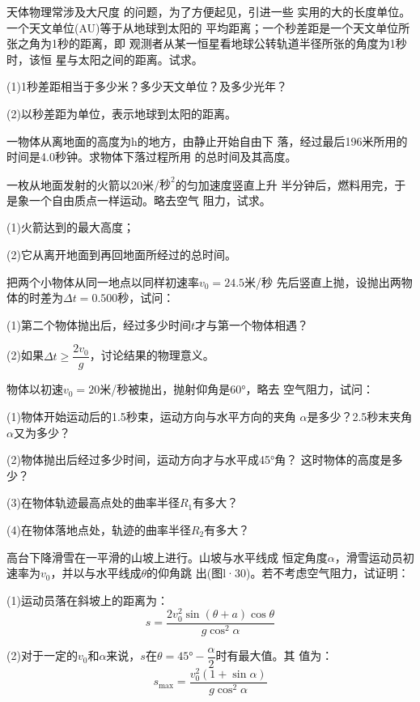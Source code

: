 \exercise 天体物理常涉及大尺度
的问题，为了方便起见，引进一些
实用的大的长度单位。一个天文单位(AU)等于从地球到太阳的
平均距离；一个秒差距是一个天文单位所张之角为1秒的距离，即
观测者从某一恒星看地球公转轨道半径所张的角度为1秒时，该恒
星与太阳之间的距离。试求。

(1)1秒差距相当于多少米？多少天文单位？及多少光年？

(2)以秒差距为单位，表示地球到太阳的距离。

\exercise 一物体从离地面的高度为h的地方，由静止开始自由下
落，经过最后196米所用的时间是4.0秒钟。求物体下落过程所用
的总时间及其高度。

\exercise 一枚从地面发射的火箭以20米/$\text{秒}^2$的匀加速度竖直上升
半分钟后，燃料用完，于是象一个自由质点一样运动。略去空气
阻力，试求。

(1)火箭达到的最大高度；

(2)它从离开地面到再回地面所经过的总时间。

\exercise 把两个小物体从同一地点以同样初速率$v_0=24.5$米/秒
先后竖直上抛，设抛出两物体的时差为$\Delta t=0.500$秒，试问：

(1)第二个物体抛出后，经过多少时间$t$才与第一个物体相遇？

(2)如果$\Delta t\geqslant\dfrac{2v_0}{g}$，讨论结果的物理意义。


\exercise 物体以初速$v_0=20$米/秒被抛出，抛射仰角是\ang{60;;}，略去
空气阻力，试问：

(1)物体开始运动后的1.5秒束，运动方向与水平方向的夹角
$\alpha$是多少？2.5秒末夹角$\alpha$又为多少？

(2)物体抛出后经过多少时间，运动方向才与水平成\ang{45;;}角？
这时物体的高度是多少？

(3)在物体轨迹最高点处的曲率半径$R_1$有多大？

(4)在物体落地点处，轨迹的曲率半径$R_2$有多大？

\exercise 高台下降滑雪在一平滑的山坡上进行。山坡与水平线成
恒定角度$\alpha$，滑雪运动员初速率为$v_0$，并以与水平线成$\theta$的仰角跳
出(图l·30)。若不考虑空气阻力，试证明：

(1)运动员落在斜坡上的距离为：
\begin{equation*}
    s=\frac{2 v_{0}^{2} \sin (\theta+a) \cos \theta}{g \cos ^{2} \alpha}
\end{equation*}

(2)对于一定的$v_0$和$\alpha$来说，$s$在$\theta=\ang{45;;}-\dfrac{\alpha}{2}$时有最大值。其
值为：
\begin{equation*}
    s_{\max }=\frac{v_{0}^{2}(1+\sin \alpha)}{g \cos ^{2} \alpha}
\end{equation*}


